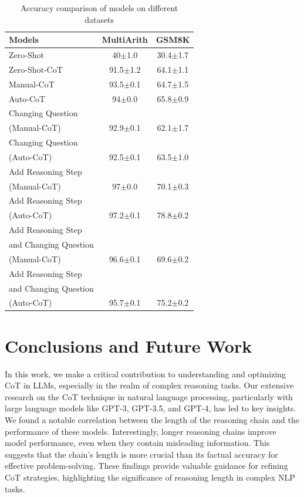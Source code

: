 \documentclass[11pt]{article}
\begin{document}
\begin{table}[t]
\small
\centering
\caption{Accuracy comparison of models on different datasets}
\begin{tabular}{lcc}
\toprule
Models & MultiArith & GSM8K \\
\midrule
Zero-Shot & 40$\pm$1.0 & 30.4$\pm$1.7 \\
Zero-Shot-CoT & 91.5$\pm$1.2 & 64.1$\pm$1.1 \\
Manual-CoT & 93.5$\pm$0.1 & 64.7$\pm$1.5 \\
Auto-CoT & 94$\pm$0.0 & 65.8$\pm$0.9 \\
\hline %
Changing Question \\(Manual-CoT) & 92.9$\pm$0.1 & 62.1$\pm$1.7 \\
Changing Question \\(Auto-CoT) & 92.5$\pm$0.1 & 63.5$\pm$1.0 \\
\hline
Add Reasoning Step \\(Manual-CoT) & 97$\pm$0.0 & 70.1$\pm$0.3 \\
Add Reasoning Step \\(Auto-CoT) & 97.2$\pm$0.1 & 78.8$\pm$0.2 \\
\hline
Add Reasoning Step \\and Changing Question\\(Manual-CoT) & 96.6$\pm$0.1 & 69.6$\pm$0.2 \\
Add Reasoning Step \\and Changing Question\\(Auto-CoT) & 95.7$\pm$0.1 & 75.2$\pm$0.2 \\
\bottomrule
\end{tabular}
\label{tab:case1}
\end{table}

\section{Conclusions and Future Work}
In this work, we make a critical contribution to understanding and optimizing CoT in LLMs, especially in the realm of complex reasoning tasks. Our extensive research on the CoT technique in natural language processing, particularly with large language models like GPT-3, GPT-3.5, and GPT-4, has led to key insights. We found a notable correlation between the length of the reasoning chain and the performance of these models. Interestingly, longer reasoning chains improve model performance, even when they contain misleading information. This suggests that the chain's length is more crucial than its factual accuracy for effective problem-solving. These findings provide valuable guidance for refining CoT strategies, highlighting the significance of reasoning length in complex NLP tasks.
\end{document}
